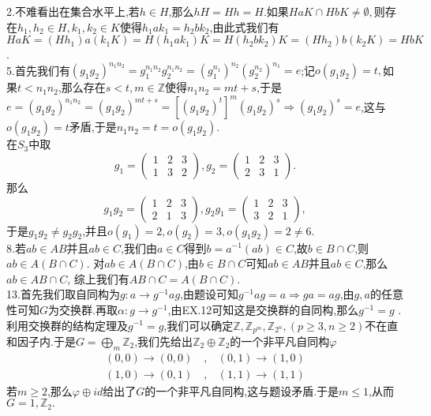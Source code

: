 \documentclass[b5paper]{ctexart}
\begin{document}
\pagestyle{plain}
\noindent
2.不难看出在集合水平上,若$h\in H$,那么$hH=Hh=H$.如果$HaK\cap HbK\neq\emptyset,$则存在$h_1,h_2\in H,k_1,k_2\in K$使得$h_1ak_1=h_2bk_2$,由此式我们有$HaK=(Hh_1)a(k_1K)=H(h_1ak_1)K=H(h_2bk_2)K=(Hh_2)b(k_2K)=HbK$.\\
5.首先我们有$(g_1g_2)^{n_1n_2}=g_1^{n_1n_2}g_2^{n_1n_2}=(g_1^{n_1})^{n_2}(g_2^{n_2})^{n_1}=e$;记$o(g_1g_2)=t,$如果$t<n_1n_2$,那么存在$s<t,m\in\mathbb{Z}$使得$n_1n_2=mt+s$,于是$e=(g_1g_2)^{n_1n_2}=(g_1g_2)^{mt+s}=[(g_1g_2)^t]^m(g_1g_2)^s\Rightarrow (g_1g_2)^s=e$,这与$o(g_1g_2)=t$矛盾,于是$n_1n_2=t=o(g_1g_2).$\\
在$S_3$中取
\[g_1=\left( \begin{array}{lll}
1 & 2 & 3\\
1 & 3 & 2
\end{array}\right) ,
g_2=\left( \begin{array}{lll}
1 & 2 & 3\\
2 & 3 & 1
\end{array}\right) .
\]
那么
\[g_1g_2=\left( \begin{array}{lll}
1 & 2 & 3\\
2 & 1 & 3
\end{array}\right) ,
g_2g_1=\left( \begin{array}{lll}
1 & 2 & 3\\
3 & 2 & 1
\end{array}\right) ,
\]
于是$g_1g_2\neq g_2g_2$,并且$o(g_1)=2,o(g_2)=3,o(g_1g_2)=2\neq 6$.\\
8.若$ab\in AB$并且$ab\in C$,我们由$a\in C
$得到$b=a^{-1}(ab)\in C$,故$b\in B\cap C$,则$ab\in A(B\cap C)$.
对$ab\in A(B\cap C)$,由$b\in B\cap C$可知$ab\in AB$并且$ab\in C$,那么$ab\in AB\cap C$,
综上我们有$AB\cap C=A(B\cap C).$\\
13.首先我们取自同构为$g:a\rightarrow g^{-1}ag$,由题设可知$g^{-1}ag=a\Rightarrow ga=ag$,由$g,a$的任意性可知$G$为交换群.再取$\alpha:g\rightarrow g^{-1}$,由EX.12可知这是交换群的自同构,那么$g^{-1}=g$
.利用交换群的结构定理及$g^{-1}=g$,我们可以确定$\mathbb{Z},\mathbb{Z}_{p^m},\mathbb{Z}_{2^n},(p\geq 3,n\geq 2)$不在直和因子内.于是$G=\bigoplus\limits_m \mathbb{Z}_2$,我们先给出$\mathbb{Z}_2\oplus \mathbb{Z}_2$的一个非平凡自同构$\varphi$
\[
\begin{array}{ll}
(0,0)\rightarrow (0,0) \quad ,& (0,1)\rightarrow (1,0)\\
(1,0)\rightarrow (0,1) \quad ,& (1,1)\rightarrow (1,1)
\end{array}\]
若$m\geq 2$,那么$\varphi\oplus id$给出了$G$的一个非平凡自同构,这与题设矛盾.于是$m\leq 1$,从而$G=1,\mathbb{Z}_2.$
\end{document}
